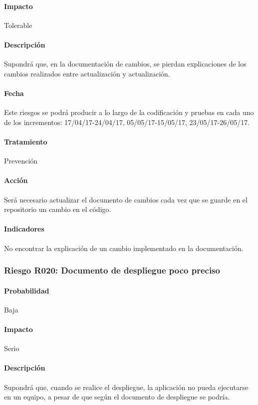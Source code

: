 \documentclass[10pt,a4paper]{article}
\begin{document}
				\paragraph{Impacto}	Tolerable
				\paragraph{Descripción} Supondrá que, en la documentación de cambios, se pierdan explicaciones de los cambios realizados entre actualización y actualización.
				\paragraph{Fecha} Este riesgos se podrá producir a lo largo de la codificación y pruebas en cada uno de los incrementos: 17/04/17-24/04/17, 05/05/17-15/05/17, 23/05/17-26/05/17.  %
				\paragraph{Tratamiento} Prevención %
				\paragraph{Acción} Será necesario actualizar el documento de cambios cada vez que se guarde en el repositorio un cambio en el código. %
				\paragraph{Indicadores} No encontrar la explicación de un cambio implementado en la documentación. %
			
			\subsubsection{Riesgo R020: Documento de despliegue poco preciso }
				\paragraph{Probabilidad} Baja
				\paragraph{Impacto}	Serio
				\paragraph{Descripción} Supondrá que, cuando se realice el despliegue, la aplicación no pueda ejecutarse en un equipo, a pesar de que según el documento de despliegue se podría.
\end{document}
